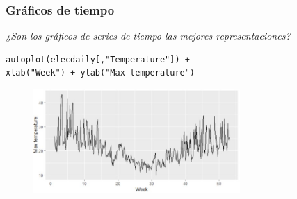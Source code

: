 \documentclass[10pt]{beamer}
\begin{document}




\begin{frame}[fragile]
\frametitle{Gráficos de tiempo}

\begin{center}
\textit{¿Son los gráficos de series de tiempo las mejores representaciones?}
\end{center}



\lstset{language=r,label= ,caption= ,captionpos=b,numbers=none}
\begin{lstlisting}
autoplot(elecdaily[,"Temperature"]) +
xlab("Week") + ylab("Max temperature")
\end{lstlisting}

\pause


\begin{figure}
\begin{center}
    \includegraphics[width=0.7\textwidth]{Imagen15.JPG}
\end{center}
\end{figure}




\end{frame}


\end{document}

